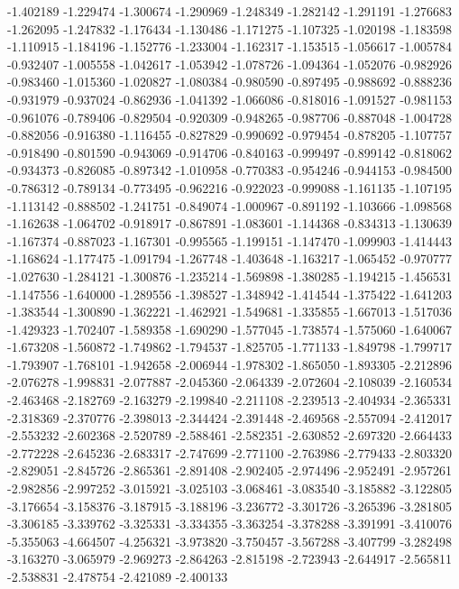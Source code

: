 -1.402189
-1.229474
-1.300674
-1.290969
-1.248349
-1.282142
-1.291191
-1.276683
-1.262095
-1.247832
-1.176434
-1.130486
-1.171275
-1.107325
-1.020198
-1.183598
-1.110915
-1.184196
-1.152776
-1.233004
-1.162317
-1.153515
-1.056617
-1.005784
-0.932407
-1.005558
-1.042617
-1.053942
-1.078726
-1.094364
-1.052076
-0.982926
-0.983460
-1.015360
-1.020827
-1.080384
-0.980590
-0.897495
-0.988692
-0.888236
-0.931979
-0.937024
-0.862936
-1.041392
-1.066086
-0.818016
-1.091527
-0.981153
-0.961076
-0.789406
-0.829504
-0.920309
-0.948265
-0.987706
-0.887048
-1.004728
-0.882056
-0.916380
-1.116455
-0.827829
-0.990692
-0.979454
-0.878205
-1.107757
-0.918490
-0.801590
-0.943069
-0.914706
-0.840163
-0.999497
-0.899142
-0.818062
-0.934373
-0.826085
-0.897342
-1.010958
-0.770383
-0.954246
-0.944153
-0.984500
-0.786312
-0.789134
-0.773495
-0.962216
-0.922023
-0.999088
-1.161135
-1.107195
-1.113142
-0.888502
-1.241751
-0.849074
-1.000967
-0.891192
-1.103666
-1.098568
-1.162638
-1.064702
-0.918917
-0.867891
-1.083601
-1.144368
-0.834313
-1.130639
-1.167374
-0.887023
-1.167301
-0.995565
-1.199151
-1.147470
-1.099903
-1.414443
-1.168624
-1.177475
-1.091794
-1.267748
-1.403648
-1.163217
-1.065452
-0.970777
-1.027630
-1.284121
-1.300876
-1.235214
-1.569898
-1.380285
-1.194215
-1.456531
-1.147556
-1.640000
-1.289556
-1.398527
-1.348942
-1.414544
-1.375422
-1.641203
-1.383544
-1.300890
-1.362221
-1.462921
-1.549681
-1.335855
-1.667013
-1.517036
-1.429323
-1.702407
-1.589358
-1.690290
-1.577045
-1.738574
-1.575060
-1.640067
-1.673208
-1.560872
-1.749862
-1.794537
-1.825705
-1.771133
-1.849798
-1.799717
-1.793907
-1.768101
-1.942658
-2.006944
-1.978302
-1.865050
-1.893305
-2.212896
-2.076278
-1.998831
-2.077887
-2.045360
-2.064339
-2.072604
-2.108039
-2.160534
-2.463468
-2.182769
-2.163279
-2.199840
-2.211108
-2.239513
-2.404934
-2.365331
-2.318369
-2.370776
-2.398013
-2.344424
-2.391448
-2.469568
-2.557094
-2.412017
-2.553232
-2.602368
-2.520789
-2.588461
-2.582351
-2.630852
-2.697320
-2.664433
-2.772228
-2.645236
-2.683317
-2.747699
-2.771100
-2.763986
-2.779433
-2.803320
-2.829051
-2.845726
-2.865361
-2.891408
-2.902405
-2.974496
-2.952491
-2.957261
-2.982856
-2.997252
-3.015921
-3.025103
-3.068461
-3.083540
-3.185882
-3.122805
-3.176654
-3.158376
-3.187915
-3.188196
-3.236772
-3.301726
-3.265396
-3.281805
-3.306185
-3.339762
-3.325331
-3.334355
-3.363254
-3.378288
-3.391991
-3.410076
-5.355063
-4.664507
-4.256321
-3.973820
-3.750457
-3.567288
-3.407799
-3.282498
-3.163270
-3.065979
-2.969273
-2.864263
-2.815198
-2.723943
-2.644917
-2.565811
-2.538831
-2.478754
-2.421089
-2.400133
